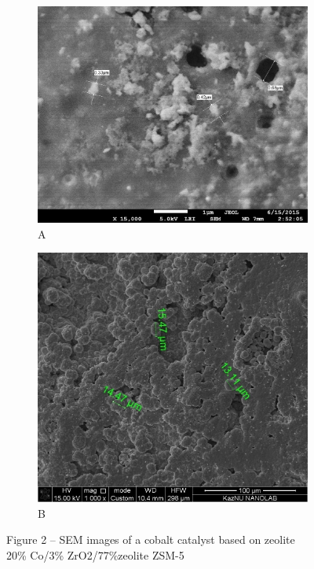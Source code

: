\begin{figure}[H]
    \centering
    \begin{subfigure}[b]{0.45\textwidth}
        \centering
        \includegraphics[width=\textwidth]{assets/1077}
        \caption*{A}
    \end{subfigure}
    \hfill
    \begin{subfigure}[b]{0.45\textwidth}
        \centering
        \includegraphics[width=\textwidth]{assets/1078}
        \caption*{B}
    \end{subfigure}
    \caption*{Figure 2 -- SEM images of a cobalt catalyst based on zeolite\\ 20\% Co/3\% ZrO2/77\%zeolite ZSM-5}
\end{figure}

